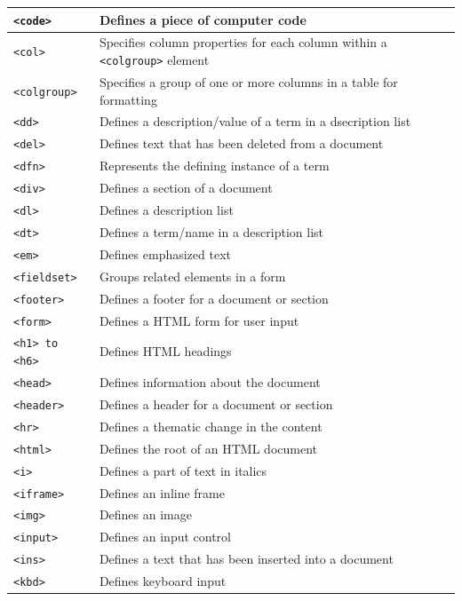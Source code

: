 \documentclass[11pt, letterpaper]{article}
\begin{document}
\begin{longtable}{l p{10cm} l}
			\texttt{<code>} & Defines a piece of computer code\\\midrule
			\texttt{<col>} & Specifies column properties for each column within a \texttt{<colgroup>} element\\\midrule
			\texttt{<colgroup>} & Specifies a group of one or more columns in a table for formatting\\\midrule
			\texttt{<dd>} & Defines a description/value of a term in a dsecription list\\\midrule
			\texttt{<del>} & Defines text that has been deleted from a document\\\midrule
			\texttt{<dfn>} & Represents the defining instance of a term \\\midrule
			\texttt{<div>} & Defines a section of a document\\\midrule
			\texttt{<dl>} & Defines a description list\\\midrule
			\texttt{<dt>} & Defines a term/name in a description list\\\midrule
			\texttt{<em>} & Defines emphasized text \\\midrule
			\texttt{<fieldset>} & Groups related elements in a form\\\midrule
			\texttt{<footer>} & Defines a footer for a document or section\\\midrule
			\texttt{<form>} & Defines a HTML form for user input\\\midrule
			\texttt{<h1> to <h6>} & Defines HTML headings\\\midrule
			\texttt{<head>} & Defines information about the document\\\midrule
			\texttt{<header>} & Defines a header for a document or section\\\midrule
			\texttt{<hr>} & Defines a thematic change in the content\\\midrule
			\texttt{<html>} & Defines the root of an HTML document\\\midrule
			\texttt{<i>} & Defines a part of text in italics\\\midrule
			\texttt{<iframe>} & Defines an inline frame\\\midrule
			\texttt{<img>} & Defines an image\\\midrule
			\texttt{<input>} & Defines an input control\\\midrule
			\texttt{<ins>} & Defines a text that has been inserted into a document\\\midrule
			\texttt{<kbd>} & Defines keyboard input\\\midrule

\end{longtable}
\end{document}
